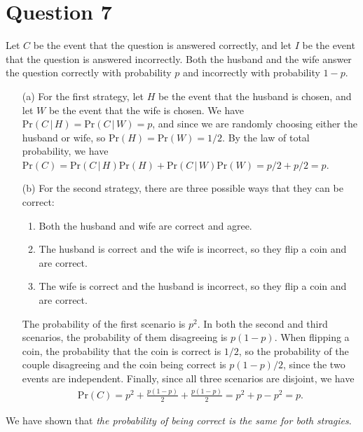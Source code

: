 \documentclass[10pt]{article}
\begin{document}
\section{Question 7} \noindent
Let \(C\) be the event that the question is answered correctly, and let \(I\) be the event that the question is answered incorrectly. 
Both the husband and the wife answer the question correctly with probability \(p\) and incorrectly with probability \(1-p\). 
\begin{itemize}
    \item[(a)] For the first strategy, let \(H\) be the event that the husband is chosen, and let \(W\) be the event that the wife is 
    chosen. We have \(\mathrm{Pr}(C \,|\, H) = \mathrm{Pr}(C \,|\, W) = p\), and since 
    we are randomly choosing either the husband or wife, so \(\mathrm{Pr}(H) = \mathrm{Pr}(W) = 1/2\). By the law of total 
    probability, we have \(\mathrm{Pr}(C) = \mathrm{Pr}(C \,|\, H) \mathrm{Pr}(H) + \mathrm{Pr}(C \,|\, W) \mathrm{Pr}(W) = p/2 + p/2 = p\).
    \item[(b)] For the second strategy, there are three possible ways that they can be correct:
    \begin{enumerate}
        \item Both the husband and wife are correct and agree.
        \item The husband is correct and the wife is incorrect, so they flip a coin and are correct.
        \item The wife is correct and the husband is incorrect, so they flip a coin and are correct.
    \end{enumerate}
    The probability of the first scenario is \(p^2\). In both the second and third scenarios, the probability of them 
    disagreeing is \(p(1-p)\). When flipping a coin, the probability that the coin is correct is \(1/2\), so the probability
    of the couple disagreeing and the coin being correct is \(p(1-p)/2\), since the two events are independent. Finally, since all three
    scenarios are disjoint, we have 
    \begin{align*}
        \mathrm{Pr}(C) = p^2 + \frac{p(1-p)}{2} + \frac{p(1-p)}{2} = p^2 + p - p^2 = p.
    \end{align*}
\end{itemize}
We have shown that \textit{the probability of being correct is the same for both stragies}. 
\end{document}
